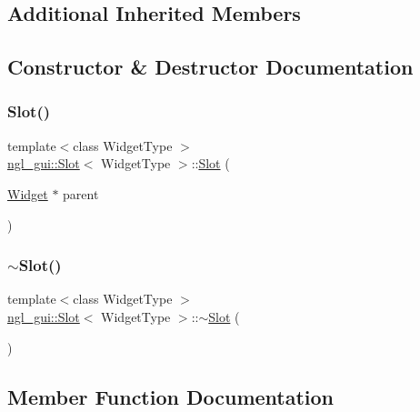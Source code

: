 \subsection*{Additional Inherited Members}


\subsection{Constructor \& Destructor Documentation}
\mbox{\label{classngl__gui_1_1_slot_ab34b598e916e664a250c3734dddb58c3}} 
\subsubsection{\texorpdfstring{Slot()}{Slot()}}
{\footnotesize\ttfamily template$<$class Widget\+Type $>$ \\
\mbox{\hyperlink{classngl__gui_1_1_slot}{ngl\+\_\+gui\+::\+Slot}}$<$ Widget\+Type $>$\+::\mbox{\hyperlink{classngl__gui_1_1_slot}{Slot}} (\begin{DoxyParamCaption}\item[{\mbox{\hyperlink{classngl__gui_1_1_widget}{Widget}} $\ast$}]{parent }\end{DoxyParamCaption})\hspace{0.3cm}{\ttfamily [explicit]}}

\mbox{\label{classngl__gui_1_1_slot_a348b414cab2f6746aa469c4d1a2ab258}} 
\subsubsection{\texorpdfstring{$\sim$\+Slot()}{~Slot()}}
{\footnotesize\ttfamily template$<$class Widget\+Type $>$ \\
\mbox{\hyperlink{classngl__gui_1_1_slot}{ngl\+\_\+gui\+::\+Slot}}$<$ Widget\+Type $>$\+::$\sim$\mbox{\hyperlink{classngl__gui_1_1_slot}{Slot}} (\begin{DoxyParamCaption}{ }\end{DoxyParamCaption})}



\subsection{Member Function Documentation}
\mbox{\label{classngl__gui_1_1_slot_a40dffade72ef8f4a331c846ead3a71c9}} 

